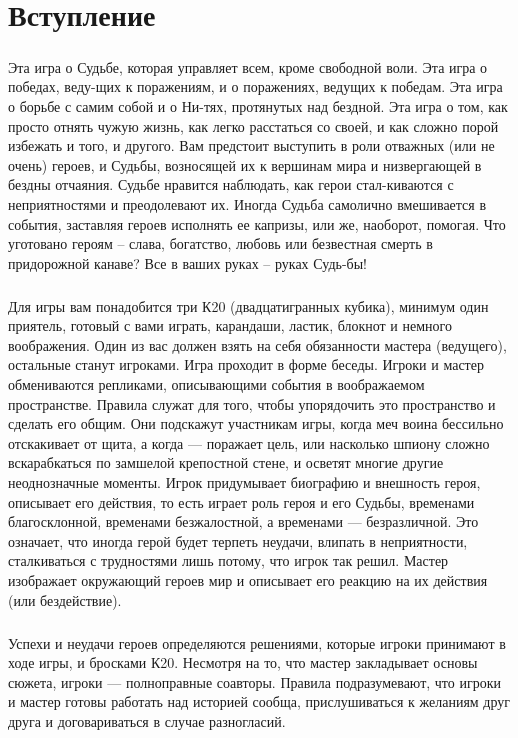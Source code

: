 \chapter*{Вступление}
\paragraph{}Эта игра о Судьбе, которая управляет всем, кроме свободной воли. Эта игра о победах, веду-щих к поражениям, и о поражениях, ведущих к победам. Эта игра о борьбе с самим собой и о Ни-тях, протянутых над бездной. Эта игра о том, как просто отнять чужую жизнь, как легко расстаться со своей, и как сложно порой избежать и того, и другого. 
\newline Вам предстоит выступить в роли отважных (или не очень) героев, и Судьбы, возносящей их к вершинам мира и низвергающей в бездны отчаяния. Судьбе нравится наблюдать, как герои стал-киваются с неприятностями и преодолевают их. Иногда Судьба самолично вмешивается в события, заставляя героев исполнять ее капризы, или же, наоборот, помогая. Что уготовано героям – слава, богатство, любовь или безвестная смерть в придорожной канаве? Все в ваших руках – руках Судь-бы!

\paragraph{}Для игры вам понадобится три К20 (двадцатигранных кубика), минимум один приятель, готовый с вами играть, карандаши, ластик, блокнот и немного воображения. Один из вас должен взять на себя обязанности мастера (ведущего), остальные станут игроками. Игра проходит в форме беседы. Игроки и мастер обмениваются репликами, описывающими события в воображаемом пространстве. Правила служат для того, чтобы упорядочить это пространство и сделать его общим. Они подскажут участникам игры, когда меч воина бессильно отскакивает от щита, а когда — поражает цель, или насколько шпиону сложно вскарабкаться по замшелой крепостной стене, и осветят многие другие неоднозначные моменты. Игрок придумывает биографию и внешность героя, описывает его действия, то есть играет роль героя и его Судьбы, временами благосклонной, временами безжалостной, а временами — безразличной. Это означает, что иногда герой будет терпеть неудачи, влипать в неприятности, сталкиваться с трудностями лишь потому, что игрок так решил. Мастер изображает окружающий героев мир и описывает его реакцию на их действия (или бездействие).

\paragraph{}Успехи и неудачи героев определяются решениями, которые игроки принимают в ходе игры, и бросками К20. Несмотря на то, что мастер закладывает основы сюжета, игроки — полноправные соавторы. Правила подразумевают, что игроки и мастер готовы работать над историей сообща, прислушиваться к желаниям друг друга и договариваться в случае разногласий.

